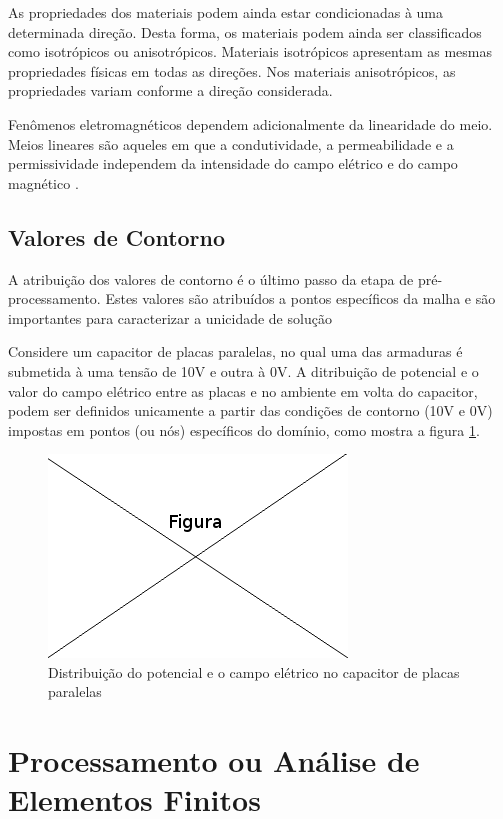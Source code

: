\documentclass[
    12pt,               %
    openright,          %
    oneside,
    a4paper,            %
    english,            %
    french,             %
    spanish,            %
    brazil              %
    ]{abntex2}
\begin{document}
As propriedades dos materiais podem ainda estar condicionadas à uma determinada direção. Desta forma, os materiais podem ainda ser classificados como isotrópicos ou anisotrópicos\cite[p. 20]{sadiku}.  Materiais isotrópicos apresentam as mesmas propriedades físicas em todas as direções. Nos materiais anisotrópicos, as propriedades variam conforme a direção considerada.

Fenômenos eletromagnéticos dependem adicionalmente da linearidade do meio. Meios lineares são aqueles em que a condutividade, a permeabilidade e a permissividade independem da intensidade do campo elétrico e do campo magnético \cite[p. 20]{sadiku} .


\subsection{Valores de Contorno}
A atribuição dos valores de contorno é o último passo da etapa de pré- processamento. Estes valores são atribuídos a pontos específicos da malha e são importantes para caracterizar a unicidade de solução \cite[p. 7]{zien}

Considere um capacitor de placas paralelas, no qual uma das armaduras é submetida à uma tensão de 10V e outra à 0V. A ditribuição de potencial e o valor do campo elétrico entre as placas e no ambiente em volta do capacitor, podem ser definidos unicamente a partir das condições de contorno (10V e 0V) impostas em pontos (ou nós) específicos do domínio, como mostra a figura \ref{fig:capacitor}.

\begin{figure}[!htb]
\centering
\includegraphics[scale=0.5]{figuras/temp.png}
\caption{Distribuição do potencial e o campo elétrico no capacitor de placas paralelas}
\label{fig:capacitor}
\end{figure}


\section{Processamento ou Análise de Elementos Finitos}
\label{sec:proc}
\end{document}
